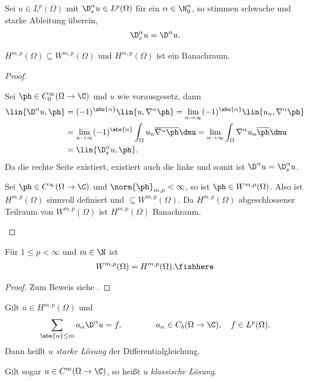\begin{prop}
\label{prop:7.39}
\begin{propenum}
\item Sei $u\in L^p(\Omega)$ mit $\D_s^\alpha u\in L^p(\Omega)$ für ein
$\alpha\in\N_0^n$, so stimmen schwache und starke Ableitung überein,
\begin{align*}
\D_s^\alpha u = \D^\alpha u.
\end{align*}
\item $H^{m,p}(\Omega) \subseteq W^{m,p}(\Omega)$ und $H^{m,p}(\Omega)$ ist ein
Banachraum.\fishhere
\end{propenum}
\end{prop}
\begin{proof}
\begin{proofenum}
\item Sei $\ph\in C_0^\infty(\Omega\to\C)$ und $u$ wie vorausgesetz, dann
\begin{align*}
\lin{\D^\alpha u,\ph} &= (-1)^{\abs{\alpha}}\lin{u,\nabla^\alpha \ph}
= \lim\limits_{n\to\infty}
(-1)^{\abs{\alpha}}\lin{u_n,\nabla^\alpha \ph}\\
&= \lim\limits_{n\to\infty}
(-1)^{\abs{\alpha}}\int_\Omega u_n \overline{\nabla^\alpha \ph}\dmu
= \lim\limits_{n\to\infty}
\int_\Omega \nabla^\alpha u_n \overline{\ph}\dmu\\
&=\lin{\D_s^\alpha u,\ph}.
\end{align*}
Da die rechte Seite existiert, existiert auch die linke und somit ist
$\D^\alpha u = \D^\alpha_s u$.
\item Sei $\ph\in C^\infty(\Omega\to\C)$ und $\norm{\ph}_{m,p}< \infty$, so
ist $\ph\in W^{m,p}(\Omega)$. Also ist $H^{m,p}(\Omega)$ sinnvoll definiert und
$\subseteq W^{m,p}(\Omega)$. Da $H^{m,p}(\Omega)$ abgeschlossener Teilraum von
$W^{m,p}(\Omega)$ ist $H^{m,p}(\Omega)$ Banachraum.\qedhere
\end{proofenum}
\end{proof}

\begin{prop}
Für $1\le p < \infty$ und $m\in\N$ ist
\begin{align*}
W^{m,p}(\Omega)=H^{m,p}(\Omega).\fishhere
\end{align*}
\end{prop}
\begin{proof}
Zum Beweis siehe \cite{Adams75}.\qedhere
\end{proof}

\begin{defn}
\label{defn:7.41}
Gilt $u\in H^{m,p}(\Omega)$ und
\begin{align*}
\sum_{\abs{\alpha}\le m} a_\alpha \D^\alpha u = f,\qquad
\qquad
a_\alpha\in C_b(\Omega\to\C),\quad f\in L^p(\Omega).
\end{align*}
Dann heißt $u$ \emph{starke Lösung} der
Differentialgleichung.

Gilt sogar $u\in C^m(\Omega\to\C)$, so heißt $u$ \emph{klassische
Lösung}.\fishhere
\end{defn}

